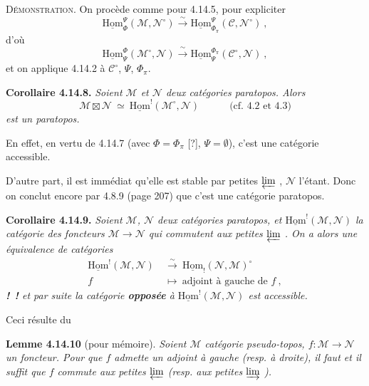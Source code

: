\documentclass[11pt]{article}
\newcommand{\printedpage}[1]{\marginpar{\footnotesize p.~#1}}
\newcommand{\msp}[1]{\marginpar{\footnotesize [#1]}}
\newcommand{\uHom}{\underline{\mathrm{Hom}}}
\begin{document}
\noindent\textsc{Démonstration}. On procède comme pour 4.14.5, pour expliciter
\[
\uHom^{\Psi}_{\Phi}(\mathcal{M},\mathcal{N}^{\circ}) \xrightarrow{\ \sim\ } \uHom^{\Psi}_{\Phi_\pi}(\mathcal{C},\mathcal{N}^{\circ})\ ,
\]
d'où
\[
\uHom^{\Phi}_{\Psi}(\mathcal{M}^{\circ},\mathcal{N}) \xrightarrow{\ \sim\ } \uHom^{\Phi_\pi}_{\Psi}(\mathcal{C}^{\circ},\mathcal{N})\ ,
\]
et on applique 4.14.2 à $\mathcal{C}^{\circ}$, $\Psi$, $\Phi_\pi$.

\noindent\textbf{Corollaire 4.14.8.} {\itshape Soient $\mathcal{M}$ et $\mathcal{N}$ deux catégories paratopos. Alors
\[
\mathcal{M}\boxtimes\mathcal{N}\ \simeq\ \uHom^{!}(\mathcal{M}^{\circ},\mathcal{N}) \qquad\quad \text{(cf. 4.2 et 4.3)}
\]
est un paratopos.}

En effet, en vertu de 4.14.7 (avec $\Phi=\Phi_\pi$ [?], $\Psi=\emptyset$), c'est une catégorie accessible.

\msp{page 379}

D'autre part, il est immédiat qu'elle est stable par petites $\varprojlim$ , $\mathcal{N}$ l'étant. Donc on conclut encore par 4.8.9 (page 207) que c'est une catégorie paratopos.

\noindent\textbf{Corollaire 4.14.9.} {\itshape Soient $\mathcal{M}$, $\mathcal{N}$ deux catégories paratopos, et $\uHom^{!}(\mathcal{M},\mathcal{N})$ la catégorie des foncteurs $\mathcal{M}\longrightarrow\mathcal{N}$ qui commutent aux petites $\varprojlim$ . On a alors une équivalence de catégories
\[
\begin{aligned}
\uHom^{!}(\mathcal{M},\mathcal{N}) &\ \xrightarrow{\ \sim\ }\ \uHom_{!}(\mathcal{N},\mathcal{M})^{\circ}\\
f &\ \longmapsto\ \text{adjoint à gauche de } f\ ,
\end{aligned}
\]
\noindent\textup{\textbf{!}}\ \textup{\textbf{!}} et par suite la catégorie \textup{\textbf{opposée}} à $\uHom^{!}(\mathcal{M},\mathcal{N})$ est accessible.} %

Ceci résulte du

\noindent\textbf{Lemme 4.14.10} (pour mémoire). {\itshape Soient $\mathcal{M}$ catégorie pseudo-topos, $f:\mathcal{M}\longrightarrow\mathcal{N}$ un foncteur. Pour que $f$ admette un adjoint à gauche (resp. à droite), il faut et il suffit que $f$ commute aux petites $\varprojlim$ (resp. aux petites $\varinjlim$ ).}

\printedpage{144}
\end{document}
